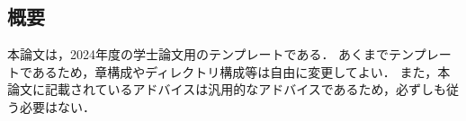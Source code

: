 \begin{center}
    \subsection*{概要}
\end{center}

本論文は，2024年度の学士論文用のテンプレートである．
あくまでテンプレートであるため，章構成やディレクトリ構成等は自由に変更してよい．
また，本論文に記載されているアドバイスは汎用的なアドバイスであるため，必ずしも従う必要はない．

